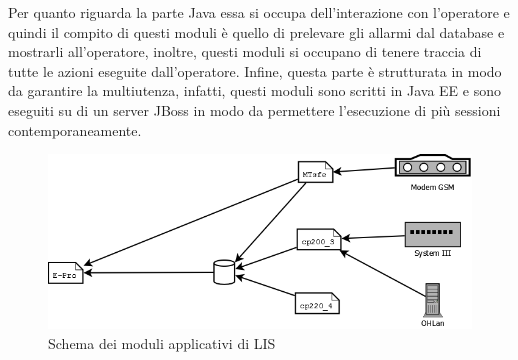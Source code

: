Per quanto riguarda la parte Java essa si occupa dell'interazione con l'operatore e quindi il compito di questi moduli è quello di prelevare gli allarmi dal database e mostrarli all'operatore, inoltre, questi moduli si occupano di tenere traccia di tutte le azioni eseguite dall'operatore. Infine, questa parte è strutturata in modo da garantire la multiutenza, infatti, questi moduli sono scritti in Java EE e sono eseguiti su di un server JBoss in modo da permettere l'esecuzione di più sessioni contemporaneamente.
\begin{figure}
\centering
\includegraphics[width=0.7\linewidth]{pictures/struttura.png}
\caption{Schema dei moduli applicativi di LIS}\label{img:struttura}
\end{figure}
